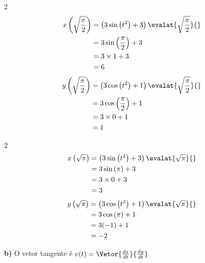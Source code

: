 \documentclass[a4paper,12pt,fleqn]{article}
\begin{document}
\begin{answer}
  \clearpage
  \begin{multicols}{2}
    \begin{align*}
      x\left(\sqrt{\frac{\pi}{2}}\right)
      & = \left(3 \sin\left(t^2\right) +3\right) \evalat{\sqrt{\frac{\pi}{2}}}{} \\
      & = 3 \sin\left(\frac{\pi}{2}\right) +3 \\
      & = 3 \times 1 +3 \\
      & = 6
    \end{align*}
    \newcolumn
    \begin{align*}
      y\left(\sqrt{\frac{\pi}{2}}\right)
      & = \left(3 \cos\left(t^2\right) +1\right) \evalat{\sqrt{\frac{\pi}{2}}}{} \\
      & = 3 \cos\left(\frac{\pi}{2}\right) +1 \\
      & = 3 \times 0 +1 \\
      & = 1
    \end{align*}
  \end{multicols}
  \vspace{-\baselineskip}
  \begin{multicols}{2}
    \begin{align*}
      x\left(\sqrt{\pi}\right)
      & = \left(3 \sin\left(t^2\right) +3\right) \evalat{\sqrt{\pi}}{} \\
      & = 3 \sin\left(\pi\right) +3 \\
      & = 3 \times 0 +3 \\
      & = 3
    \end{align*}
    \newcolumn
    \begin{align*}
      y\left(\sqrt{\pi}\right)
      & = \left(3 \cos\left(t^2\right) +1\right) \evalat{\sqrt{\pi}}{} \\
      & = 3 \cos\left(\pi\right) +1 \\
      & = 3 (-1) +1 \\
      & = -2
    \end{align*}
  \end{multicols}
  \vspace{-2\baselineskip}
  \textbf{b)} \quad
  O vetor tangente é
  \(
  v(t) = \Vetor{\frac{dx}{dt}}{\frac{dy}{dt}}
  \)


\end{answer}
\end{document}
